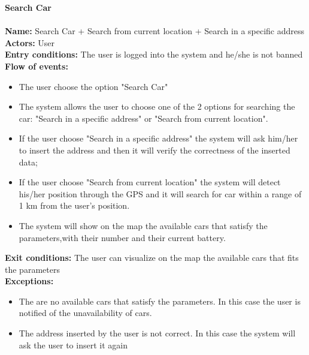 \textbf{Search Car}\\
\\
\textbf{Name:} Search Car + Search from current location + Search in a specific address\\
\textbf{Actors:} User\\
\textbf{Entry conditions:} The user is logged into the system and he/she is not banned\\
\textbf{Flow of events:}
\begin{itemize}
\item The user choose the option "Search Car"
\item The system allows the user to choose one of the 2 options for searching the car: "Search in a specific address" or "Search from current location".
\item If the user choose "Search in a specific address" the system will ask him/her to insert the address and then it will verify the correctness of the inserted data;
\item If the user choose "Search from current location" the system will detect his/her position through the GPS and it will search for car within a range of 1 km from the user's position.
\item The system will show on the map the available cars that satisfy the parameters,with their number and their current battery.
\end{itemize}
\textbf{Exit conditions:} The user can visualize on the map the available cars that fits the parameters \\
\textbf{Exceptions:}  
\begin{itemize}
\item The are no available cars that satisfy the parameters. In this case the user is notified of the unavailability of cars.
\item The address inserted by the user is not correct. In this case the system will ask the user to insert it again
\end{itemize}

